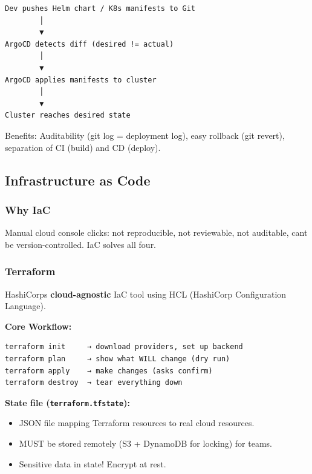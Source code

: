 \documentclass[11pt]{article}
\providecommand{\tightlist}{\setlength{\itemsep}{1pt}\setlength{\parskip}{0pt}}
\begin{document}
\setcodelang{}

\begin{verbatim}
Dev pushes Helm chart / K8s manifests to Git
        │
        ▼
ArgoCD detects diff (desired != actual)
        │
        ▼
ArgoCD applies manifests to cluster
        │
        ▼
Cluster reaches desired state
\end{verbatim}

Benefits: Auditability (git log = deployment log), easy rollback (git revert), separation of CI (build) and CD (deploy).

\subsection{Infrastructure as Code}\label{infrastructure-as-code}

\subsubsection{Why IaC}\label{why-iac}

Manual cloud console clicks: not reproducible, not reviewable, not auditable, can\textquotesingle t be version-controlled. IaC solves all four.

\subsubsection{Terraform}\label{terraform}

HashiCorp\textquotesingle s \textbf{cloud-agnostic} IaC tool using HCL (HashiCorp Configuration Language).

\textbf{Core Workflow:}

\setcodelang{}

\begin{verbatim}
terraform init     → download providers, set up backend
terraform plan     → show what WILL change (dry run)
terraform apply    → make changes (asks confirm)
terraform destroy  → tear everything down
\end{verbatim}

\textbf{State file (\texttt{terraform.tfstate}):}

\begin{itemize}
\tightlist
\item
  JSON file mapping Terraform resources to real cloud resources.
\item
  MUST be stored remotely (S3 + DynamoDB for locking) for teams.
\item
  Sensitive data in state! Encrypt at rest.
\end{itemize}
\end{document}
